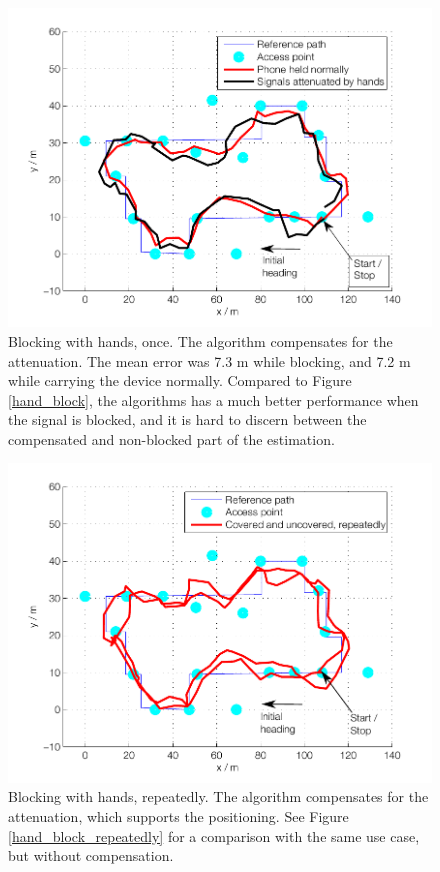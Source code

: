 \documentclass{LTHthesis}
\begin{document}
\begin{figure}[!htb]

\includegraphics[width=1\textwidth ]{images/adapt_parameters/hand_block_comp}
\caption{Blocking with hands, once. The algorithm compensates for the attenuation. The mean error was 7.3 m while blocking, and 7.2 m while carrying the device normally. Compared to Figure \ref{hand_block}, the algorithms has a much better performance when the signal is blocked, and it is hard to discern between the compensated and non-blocked part of the estimation.}\label{hand_block_comp}
\end{figure}

\begin{figure}[!htb]

\includegraphics[width=1\textwidth ]{images/adapt_parameters/hand_block_repeatedly_comp}
\caption{Blocking with hands, repeatedly. The algorithm compensates for the attenuation, which supports the positioning. See Figure \ref{hand_block_repeatedly} for a comparison with the same use case, but without compensation.} \label{hand_block_repeatedly_comp}
\end{figure}
\end{document}
